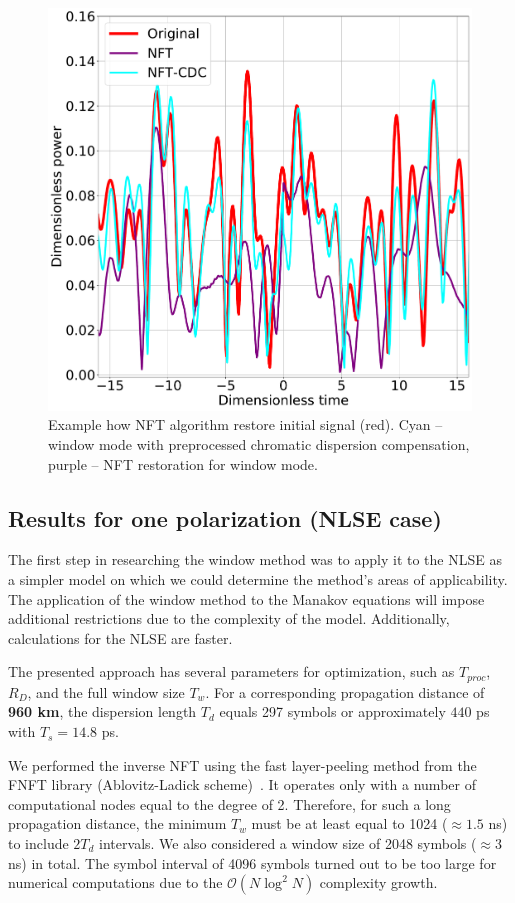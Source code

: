 \begin{figure}[htbp]
    \centering
        \includegraphics[width=0.5\linewidth]{images/window/nft_comp_cdc_m4dbm_final.pdf}
    \caption{Example how NFT algorithm restore initial signal (red). Cyan -- window mode with preprocessed chromatic dispersion compensation, purple -- NFT restoration for window mode.}
    \label{fig:nft_dbp_nft_and_cdc}
\end{figure}


\subsection{Results for one polarization (NLSE case)}

The first step in researching the window method was to apply it to the NLSE as a simpler model on which we could determine the method's areas of applicability. The application of the window method to the Manakov equations will impose additional restrictions due to the complexity of the model. Additionally, calculations for the NLSE are faster.

The presented approach has several parameters for optimization, such as $T_{proc}$, $R_D$, and the full window size $T_{w}$. For a corresponding propagation distance of \textbf{960 km}, the dispersion length $T_d$ equals 297 symbols or approximately $440$ ps with $T_s=14.8$ ps.

We performed the inverse NFT using the fast layer-peeling method from the FNFT library (Ablovitz-Ladick scheme)~\cite{Wahls2016}. It operates only with a number of computational nodes equal to the degree of 2. Therefore, for such a long propagation distance, the minimum $T_w$ must be at least equal to 1024 ($\approx 1.5$ ns) to include $2 T_d$ intervals. We also considered a window size of 2048 symbols ($\approx 3$ ns) in total. The symbol interval of 4096 symbols turned out to be too large for numerical computations due to the $\mathcal{O}(N \log^2 N)$ complexity growth.

